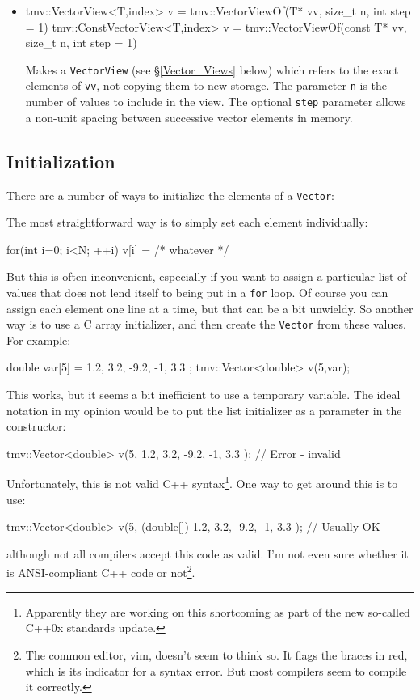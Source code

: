 \documentclass[twoside,letterpaper,11pt]{article}
\renewcommand{\tt}[1]{{\lstinline {#1}}}
\begin{document}
\begin{itemize}
\item
\begin{tmvcode}
tmv::VectorView<T,index> v = 
      tmv::VectorViewOf(T* vv, size_t n, int step = 1)
tmv::ConstVectorView<T,index> v = 
      tmv::VectorViewOf(const T* vv, size_t n, int step = 1)
\end{tmvcode}
Makes a \tt{VectorView} (see \S\ref{Vector_Views} below) which refers to the exact
elements of \tt{vv}, not copying them to new storage.  The parameter \tt{n}
is the number of values to include in the view.
The optional \tt{step} parameter allows a non-unit spacing between 
successive vector elements in memory. 

\end{itemize}

\subsection{Initialization}
\label{Vector_Initialization}

There are a number of ways to initialize the elements of a \tt{Vector}:

The most straightforward way is to simply set each element individually:
\begin{tmvcode}
for(int i=0; i<N; ++i) {
    v[i] = /* whatever */
}
\end{tmvcode}

But this is often inconvenient, especially if you want to assign a particular list of 
values that does not lend itself to being put in a \tt{for} loop.  Of course you can assign
each element one line at a time, but that can be a bit unwieldy.  So another 
way is to use a C array initializer, and then create the \tt{Vector} from these values.  For example:
\begin{tmvcode}
double var[5] = { 1.2, 3.2, -9.2, -1, 3.3 };
tmv::Vector<double> v(5,var);
\end{tmvcode}
This works, but it seems a bit inefficient to use a temporary variable.  The ideal notation
in my opinion would be to put the list initializer as a parameter in the constructor:
\begin{tmvcode}
tmv::Vector<double> v(5, 
    { 1.2, 3.2, -9.2, -1, 3.3 }); // Error - invalid
\end{tmvcode}
Unfortunately, this is not valid C++ syntax\footnote{
Apparently they are working on this shortcoming as part of the new so-called C++0x 
standards update.}.
One way to get around this is to use:
\begin{tmvcode}
tmv::Vector<double> v(5, 
    (double[]) { 1.2, 3.2, -9.2, -1, 3.3 }); // Usually OK
\end{tmvcode}
although not all compilers accept this code as valid.  I'm not even sure whether
it is ANSI-compliant C++ code or not\footnote{
The common editor, vim, doesn't seem to think so.  
It flags the braces in red, which is its indicator for a syntax error.  But most compilers
seem to compile it correctly.}.
\end{document}
